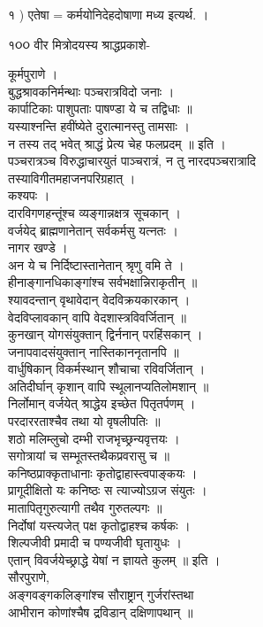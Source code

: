 \documentclass[11pt, openany]{book}
\begin{document}
{{{{{{{{{{{{%

१ ) एतेषा = कर्मयोनिदेहदोषाणा मध्य इत्यर्थ. ।

१૦૦ वीर मित्रोदयस्य श्राद्धप्रकाशे-

{कूर्मपुराणे ।\\
बुद्धश्रावकनिर्मन्थाः पञ्चरात्रविदो जनाः ।\\
कार्पाटिकाः पाशुपताः पाषण्डा ये च तद्विधाः ॥\\
यस्याश्नन्ति हवींष्येते दुरात्मानस्तु तामसाः ।\\
न तस्य तद् भवेत् श्राद्धं प्रेत्य चेह फलप्रदम् ॥ इति ।\\
पञ्चरात्रञ्च विरुद्धाचारयुतं पाञ्चरात्रं, न तु नारदपञ्चरात्रादि\\
तस्याविगीतमहाजनपरिग्रहात् ।\\
कश्यपः ।\\
दारविगणहन्तूंश्च व्यङ्गान्नक्षत्र सूचकान् ।\\
वर्जयेद् ब्राह्मणानेतान् सर्वकर्मसु यत्नतः ।\\
नागर खण्डे ।\\
अन ये च निर्दिष्टास्तानेतान् श्रृणु वमि ते ।\\
हीनाङ्गानधिकाङ्गांश्च सर्वभक्षान्निराकृतीन् ॥\\
श्यावदन्तान् वृथावेदान् वेदविक्रयकारकान् ।\\
वेदविप्लावकान् वापि वेदशास्त्रविवर्जितान् ॥\\
कुनखान् योगसंयुक्तान् द्विर्ननान् परहिंसकान् ।\\
जनापवादसंयुक्तान् नास्तिकाननृतानपि ॥\\
वार्धुषिकान् विकर्मस्थान् शौचाचा रविवर्जितान् ।\\
अतिदीर्घान् कृशान् वापि स्थूलानप्यतिलोमशान् ॥\\
निर्लोमान् वर्जयेत् श्राद्धेय इच्छेत पितृतर्पणम् ।\\
परदाररताश्चैव तथा यो वृषलीपतिः ॥\\
शठो मलिम्लुचो दम्भी राजभृच्छ्रन्यवृत्तयः ।\\
सगोत्रायां च सम्भूतस्तथैकप्रवरासु च ॥\\
कनिष्ठप्राक्कृताधानाः कृतोद्वाहास्त्वपाङ्कयः ।\\
प्रागूदीक्षितो यः कनिष्ठः स त्याज्योऽग्रज संयुतः ।\\
मातापितृगुरुत्यागी तथैव गुरुतल्पगः ॥\\
निर्दोषां यस्त्यजेत् पक्ष कृतोद्वाहश्च कर्षकः ।\\
शिल्पजीवी प्रमादी च पण्यजीवी घृतायुधः ।\\
एतान् विवर्जयेच्छ्राद्धे येषां न ज्ञायते कुलम् ॥ इति ।\\
सौरपुराणे,\\
अङ्गवङ्गकलिङ्गांश्च सौराष्ट्रान् गुर्जरांस्तथा \textbar{}\\
आभीरान कोणांश्चैष द्रविडान् दक्षिणापथान् ॥

}}}}}}}}}}}}}
\end{document}
